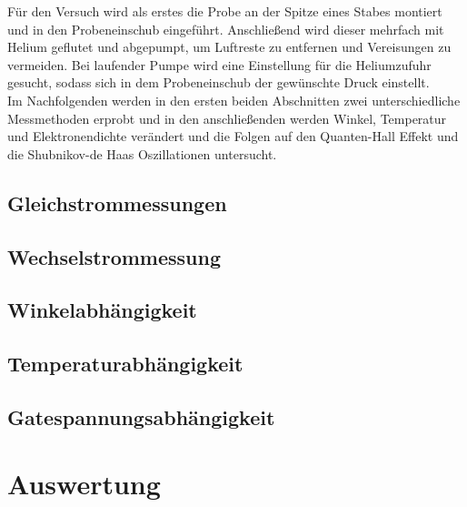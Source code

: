 \documentclass[12pt,a4paper]{article}
\begin{document}
	Für den Versuch wird als erstes die Probe an der Spitze eines Stabes montiert und in den Probeneinschub eingeführt. Anschließend wird dieser mehrfach mit Helium geflutet und abgepumpt, um Luftreste zu entfernen und Vereisungen zu vermeiden. Bei laufender Pumpe wird eine Einstellung für die Heliumzufuhr gesucht, sodass sich in dem Probeneinschub der gewünschte Druck einstellt.\\
	
	Im Nachfolgenden werden in den ersten beiden Abschnitten zwei unterschiedliche Messmethoden erprobt und in den anschließenden werden Winkel, Temperatur und Elektronendichte verändert und die Folgen auf den Quanten-Hall Effekt und die Shubnikov-de Haas Oszillationen untersucht.
	
	\subsection{Gleichstrommessungen}
	\label{ch:dc}
	
	\subsection{Wechselstrommessung}
	\label{ch:ac}
	
	\subsection{Winkelabhängigkeit}
	\label{ch:winkel}
	
	\subsection{Temperaturabhängigkeit}
	\label{ch:temp}
	
	\subsection{Gatespannungsabhängigkeit}
	\label{ch:gate}
	
	
	\newpage
	\clearpage
	
	\section{Auswertung}
	\label{chap:auswertung}
	
	
	
	
\end{document}
